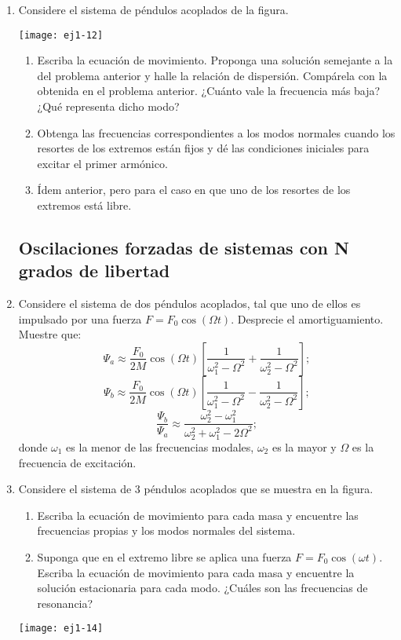 \documentclass[11pt,spanish,a4paper]{article}
\begin{document}
\begin{enumerate}
\item
\begin{minipage}[t][2cm]{0.6\textwidth}
 Considere el sistema de péndulos acoplados de la figura. 
\end{minipage}
\begin{minipage}[c][2cm][t]{0.35\textwidth}
  \texttt{[image: ej1-12]}
\end{minipage}
\begin{enumerate}
	\item Escriba la ecuación de movimiento. Proponga una solución semejante a la del problema anterior y halle la relación de dispersión. Compárela con la obtenida en el problema anterior.
	¿Cuánto vale la frecuencia más baja?
	¿Qué representa dicho modo? 
	\item Obtenga las frecuencias correspondientes a los modos normales cuando los resortes de los extremos están fijos y dé las condiciones iniciales para excitar el primer armónico. 
	\item Ídem anterior, pero para el caso en que uno de los resortes de los extremos está libre. 
\end{enumerate}


\subsection*{Oscilaciones forzadas de sistemas con N grados de libertad}

\item Considere el sistema de dos péndulos acoplados, tal que uno de ellos es impulsado por una fuerza $F= F_0 \cos(\Omega t)$.
Desprecie el amortiguamiento.
Muestre que:
\[
\Psi_a \approx \frac{F_0}{2M} \cos(\Omega t) \left[\frac{1}{\omega_1^2- \Omega^2} + \frac{1}{\omega_2^2- \Omega^2}\right];
\]
\[
\Psi_b \approx \frac{F_0}{2M} \cos(\Omega t) \left[\frac{1}{\omega_1^2- \Omega^2} - \frac{1}{\omega_2^2- \Omega^2}\right];
\]
\[
\frac{\Psi_b}{\Psi_a} \approx \frac{\omega_2^2- \omega_1^2}{\omega_2^2+ \omega_1^2- 2 \Omega^2};
\]
donde $\omega_{1}$ es la menor de las frecuencias modales, $\omega_2$ es la mayor y $\Omega$ es la frecuencia de excitación.



\item
\begin{minipage}[t][3.5cm]{0.7\textwidth}
Considere el sistema de 3 péndulos acoplados que se muestra en la figura.
\begin{enumerate}
	\item Escriba la ecuación de movimiento para cada masa y encuentre las frecuencias
	propias y los modos normales del sistema. 
	\item Suponga que en el extremo libre se aplica una fuerza $F= F_0 \cos(\omega t)$.
	Escriba la ecuación de movimiento para cada masa y encuentre la solución estacionaria para cada modo.
	¿Cuáles son las frecuencias de resonancia?
\end{enumerate}
\end{minipage}
\begin{minipage}[c][0cm][t]{0.25\textwidth}
  \texttt{[image: ej1-14]}
\end{minipage}




\end{enumerate}
\end{document}
